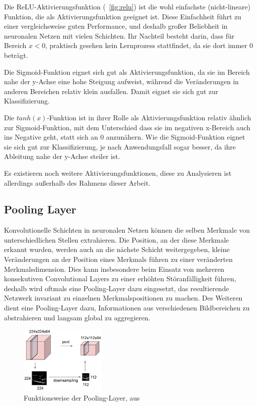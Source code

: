 Die ReLU-Aktivierungsfunktion (\vgl \figurename~\ref{fig:relu}) ist die wohl einfachste (nicht-lineare) Funktion, die als Aktivierungsfunktion geeignet ist. Diese Einfachheit führt zu einer vergleichsweise guten Performance, und deshalb großer Beliebheit in neuronalen Netzen mit vielen Schichten. Ihr Nachteil besteht darin, dass für Bereich $x<0$, praktisch gesehen kein Lernprozess stattfindet, da sie dort immer $0$ beträgt. \cite{kizrak_19}

Die Sigmoid-Funktion eignet sich gut als Aktivierungsfunktion, da sie im Bereich nahe der y-Achse eine hohe Steigung aufweist, während die Veränderungen in anderen Bereichen relativ klein ausfallen. Damit eignet sie sich gut zur Klassifizierung. \cite{kizrak_19}

Die $tanh(x)$-Funktion ist in ihrer Rolle als Aktivierungsfunktion relativ ähnlich zur Sigmoid-Funktion, mit dem Unterschied dass sie im negativen x-Bereich auch ins Negative geht, statt sich an $0$ anzunähern. Wie die Sigmoid-Funktion eignet sie sich gut zur Klassifizierung, je nach Anwendungsfall sogar besser, da ihre Ableitung nahe der y-Achse steiler ist. \cite{kizrak_19}

Es existieren noch weitere Aktivierungsfunktionen, diese zu Analysieren ist allerdings außerhalb des Rahmens dieser Arbeit.

\subsection{Pooling Layer}
\label{ssec:pooling}

Konvolutionelle Schichten in neuronalen Netzen können die selben Merkmale von unterschiedlichen Stellen extrahieren. Die Position, an der diese Merkmale erkannt wurden, werden auch an die nächste Schicht weitergegeben, \dahe kleine Veränderungen an der Position eines Merkmals führen zu einer veränderten Merkmalsdimension. \cite{brownlee_19} Dies kann insbesondere beim Einsatz von mehreren konsekutiven Convolutional Layers zu einer erhöhten Störanfälligkeit führen, deshalb wird oftmals eine Pooling-Layer dazu eingesetzt, das resultierende Netzwerk invariant zu einzelnen Merkmalspositionen zu machen. Des Weiteren dient eine Pooling-Layer dazu, Informationen aus verschiedenen Bildbereichen zu abstrahieren und langsam global zu aggregieren. \cite{deeplearning_16}

\begin{figure}
	\centering
	\includegraphics[width=0.37\textwidth,keepaspectratio]{images/cs231n/pool.jpg}
	\captionsetup{format=plain}
	\caption{Funktionsweise der Pooling-Layer, aus \cite{cs231n}}
	\label{fig:pooling}
\end{figure}

